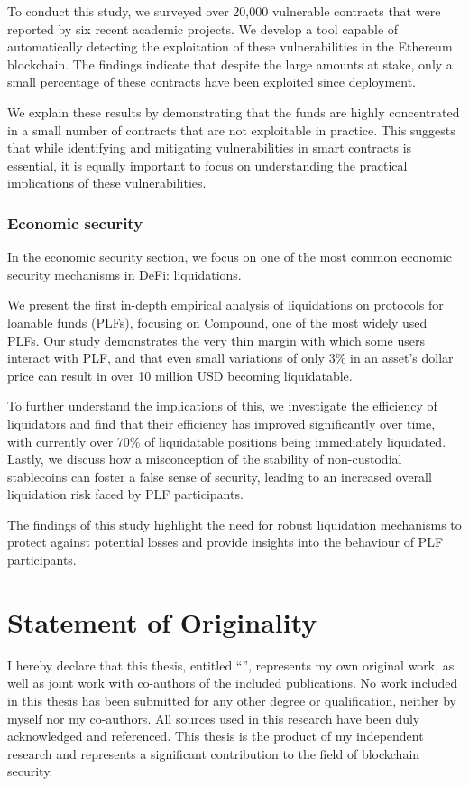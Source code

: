 To conduct this study, we surveyed over 20,000 vulnerable contracts that were reported by six recent academic projects.
We develop a tool capable of automatically detecting the exploitation of these vulnerabilities in the Ethereum blockchain.
The findings indicate that despite the large amounts at stake, only a small percentage of these contracts have been exploited since deployment.

We explain these results by demonstrating that the funds are highly concentrated in a small number of contracts that are not exploitable in practice.
This suggests that while identifying and mitigating vulnerabilities in smart contracts is essential, it is equally important to focus on understanding the practical implications of these vulnerabilities.

\subsubsection{Economic security}
In the economic security section, we focus on one of the most common economic security mechanisms in DeFi: liquidations.

We present the first in-depth empirical analysis of liquidations on protocols for loanable funds (PLFs), focusing on Compound, one of the most widely used PLFs.
Our study demonstrates the very thin margin with which some users interact with PLF, and that even small variations of only 3\% in an asset's dollar price can result in over 10 million USD becoming liquidatable.

To further understand the implications of this, we investigate the efficiency of liquidators and find that their efficiency has improved significantly over time, with currently over 70\% of liquidatable positions being immediately liquidated.
Lastly, we discuss how a misconception of the stability of non-custodial stablecoins can foster a false sense of security, leading to an increased overall liquidation risk faced by PLF participants.

The findings of this study highlight the need for robust liquidation mechanisms to protect against potential losses and provide insights into the behaviour of PLF participants.

\section{Statement of Originality}
I hereby declare that this thesis, entitled ``\thesistitle'', represents my own original work, as well as joint work with co-authors of the included publications.
No work included in this thesis has been submitted for any other degree or qualification, neither by myself nor my co-authors.
All sources used in this research have been duly acknowledged and referenced.
This thesis is the product of my independent research and represents a significant contribution to the field of blockchain security.

